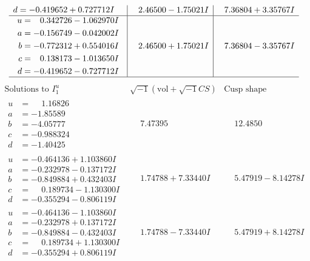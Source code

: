 \documentclass[1p]{elsarticle_modified}
\theoremstyle{definition}
\newcommand{\I}{\sqrt{-1}}
\begin{document}
$$\begin{array}{c|c|c}
\begin{aligned}
d &= -0.419652 + 0.727712 I\end{aligned}
 & \phantom{-}2.46500 - 1.75021 I & \phantom{-}7.36804 + 3.35767 I \\ \hline\begin{aligned}
u &= \phantom{-}0.342726 - 1.062970 I \\
a &= -0.156749 - 0.042002 I \\
b &= -0.772312 + 0.554016 I \\
c &= \phantom{-}0.138173 - 1.013650 I \\
d &= -0.419652 - 0.727712 I\end{aligned}
 & \phantom{-}2.46500 + 1.75021 I & \phantom{-}7.36804 - 3.35767 I\\
 \hline 
 \end{array}$$\newpage$$\begin{array}{c|c|c}  
\text{Solutions to }I^u_{1}& \I (\text{vol} + \sqrt{-1}CS) & \text{Cusp shape}\\
 \hline 
\begin{aligned}
u &= \phantom{-}1.16826\phantom{ +0.000000I} \\
a &= -1.85589\phantom{ +0.000000I} \\
b &= -4.05777\phantom{ +0.000000I} \\
c &= -0.988324\phantom{ +0.000000I} \\
d &= -1.40425\phantom{ +0.000000I}\end{aligned}
 & \phantom{-}7.47395\phantom{ +0.000000I} & \phantom{-}12.4850\phantom{ +0.000000I} \\ \hline\begin{aligned}
u &= -0.464136 + 1.103860 I \\
a &= -0.232978 - 0.137172 I \\
b &= -0.849884 + 0.432403 I \\
c &= \phantom{-}0.189734 - 1.130300 I \\
d &= -0.355294 - 0.806119 I\end{aligned}
 & \phantom{-}1.74788 + 7.33440 I & \phantom{-}5.47919 - 8.14278 I \\ \hline\begin{aligned}
u &= -0.464136 - 1.103860 I \\
a &= -0.232978 + 0.137172 I \\
b &= -0.849884 - 0.432403 I \\
c &= \phantom{-}0.189734 + 1.130300 I \\
d &= -0.355294 + 0.806119 I\end{aligned}
 & \phantom{-}1.74788 - 7.33440 I & \phantom{-}5.47919 + 8.14278 I \\ \hline\begin{aligned}

\end{aligned}
\end{array}$$
\end{document}
